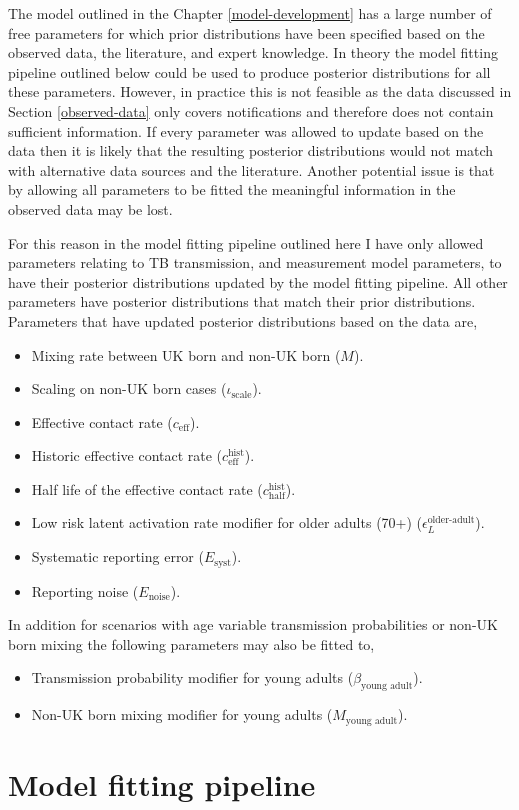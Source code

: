 \documentclass[11pt,twoside]{bristolthesis}
\providecommand{\tightlist}{%
  \setlength{\itemsep}{0pt}\setlength{\parskip}{0pt}}
\begin{document}
  The model outlined in the Chapter \ref{model-development} has a large number of free parameters for which prior distributions have been specified based on the observed data, the literature, and expert knowledge. In theory the model fitting pipeline outlined below could be used to produce posterior distributions for all these parameters. However, in practice this is not feasible as the data discussed in Section \ref{observed-data} only covers notifications and therefore does not contain sufficient information. If every parameter was allowed to update based on the data then it is likely that the resulting posterior distributions would not match with alternative data sources and the literature. Another potential issue is that by allowing all parameters to be fitted the meaningful information in the observed data may be lost.
  
  For this reason in the model fitting pipeline outlined here I have only allowed parameters relating to TB transmission, and measurement model parameters, to have their posterior distributions updated by the model fitting pipeline. All other parameters have posterior distributions that match their prior distributions. Parameters that have updated posterior distributions based on the data are,
  \begin{itemize}
  \tightlist
  \item
    Mixing rate between UK born and non-UK born (\(M\)).
  \item
    Scaling on non-UK born cases (\(\iota_{\text{scale}}\)).
  \item
    Effective contact rate (\(c_{\text{eff}}\)).
  \item
    Historic effective contact rate (\(c^{\text{hist}}_{\text{eff}}\)).
  \item
    Half life of the effective contact rate (\(c^{\text{hist}}_{\text{half}}\)).
  \item
    Low risk latent activation rate modifier for older adults (70+) (\(\epsilon^{\text{older-adult}}_L\)).
  \item
    Systematic reporting error (\(E_{\text{syst}}\)).
  \item
    Reporting noise (\(E_{\text{noise}}\)).
  \end{itemize}
  In addition for scenarios with age variable transmission probabilities or non-UK born mixing the following parameters may also be fitted to,
  \begin{itemize}
  \tightlist
  \item
    Transmission probability modifier for young adults (\(\beta_{\text{young adult}}\)).
  \item
    Non-UK born mixing modifier for young adults (\(M_{\text{young adult}}\)).
  \end{itemize}
  \hypertarget{fitting-pipeline}{%
  \section{Model fitting pipeline}\label{fitting-pipeline}}
  
\end{document}
